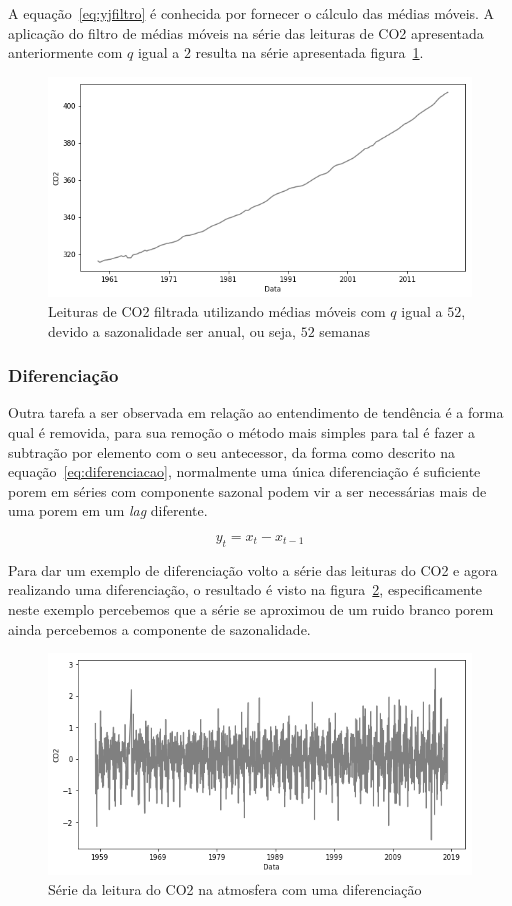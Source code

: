 \documentclass[
	12pt,
	oneside,
	a4paper,
	english,
	brazil
]{abntex2}
\begin{document}
A equação~\ref{eq:yjfiltro} é conhecida por fornecer o cálculo das médias 
móveis. A aplicação do filtro de médias móveis na série das leituras de CO2 
apresentada anteriormente com $q$ igual a $2$ resulta na série apresentada 
figura~\ref{fig:co2filtrado}.

\begin{figure}
    \centering
    \caption{Leituras de CO2 filtrada utilizando médias móveis com $q$ igual a 
    $52$, devido a sazonalidade ser anual, ou seja, $52$ 
    semanas}\label{fig:co2filtrado}
    \includegraphics[width=.6\linewidth]{images/co2_filtered.png}
\end{figure}

\subsubsection{Diferenciação}\label{sec:diff}

Outra tarefa a ser observada em relação ao entendimento de tendência é a forma 
qual é removida, para sua remoção o método mais simples para tal é fazer a 
subtração por elemento com o seu antecessor, da forma como descrito na 
equação~\ref{eq:diferenciacao}, normalmente uma única diferenciação é suficiente 
porem em séries com componente sazonal podem vir a ser necessárias mais de uma 
porem em um \textit{lag} diferente.

\begin{equation}
    \label{eq:diferenciacao}
    y_t = x_t - x_{t-1}
\end{equation}

Para dar um exemplo de diferenciação volto a série das leituras do CO2 e agora 
realizando uma diferenciação, o resultado é visto na figura~\ref{fig:co2diff}, 
especificamente neste exemplo percebemos que a série se aproximou de um ruido 
branco porem ainda percebemos a componente de sazonalidade.

\begin{figure}
    \centering
    \caption{Série da leitura do CO2 na atmosfera com uma 
    diferenciação}\label{fig:co2diff}
    \includegraphics[width=.6\linewidth]{images/co2_diff.png}
\end{figure}
\end{document}
